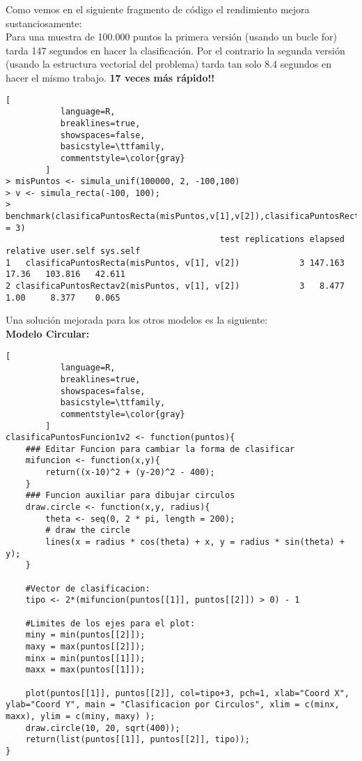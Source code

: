 \documentclass[11pt,fleqn]{book} %
\begin{document}
Como vemos en el siguiente fragmento de código el rendimiento mejora sustanciosamente:\\
Para una muestra de 100.000 puntos la primera versión (usando un bucle for) tarda 147 segundos en hacer la clasificación.
Por el contrario la segunda versión (usando la estructura vectorial del problema) tarda tan solo 8.4 segundos en hacer el mismo trabajo. \textbf{17 veces más rápido!!}

\begin{lstlisting}[
           language=R,
           breaklines=true,
           showspaces=false,
           basicstyle=\ttfamily,
           commentstyle=\color{gray}
        ]
> misPuntos <- simula_unif(100000, 2, -100,100)
> v <- simula_recta(-100, 100);
> benchmark(clasificaPuntosRecta(misPuntos,v[1],v[2]),clasificaPuntosRectav2(misPuntos,v[1],v[2]),replications = 3)
                                           test replications elapsed relative user.self sys.self
1   clasificaPuntosRecta(misPuntos, v[1], v[2])            3 147.163    17.36   103.816   42.611
2 clasificaPuntosRectav2(misPuntos, v[1], v[2])            3   8.477     1.00     8.377    0.065
\end{lstlisting}
Una solución mejorada para los otros modelos es la siguiente:\\
\textbf{Modelo Circular:}
\begin{lstlisting}[
           language=R,
           breaklines=true,
           showspaces=false,
           basicstyle=\ttfamily,
           commentstyle=\color{gray}
        ]
clasificaPuntosFuncion1v2 <- function(puntos){
    ### Editar Funcion para cambiar la forma de clasificar
    mifuncion <- function(x,y){
        return((x-10)^2 + (y-20)^2 - 400);
    }
    ### Funcion auxiliar para dibujar circulos 
    draw.circle <- function(x,y, radius){
        theta <- seq(0, 2 * pi, length = 200);
        # draw the circle
        lines(x = radius * cos(theta) + x, y = radius * sin(theta) + y);
    }
    
    #Vector de clasificacion:
    tipo <- 2*(mifuncion(puntos[[1]], puntos[[2]]) > 0) - 1
    
    #Limites de los ejes para el plot:
    miny = min(puntos[[2]]);
    maxy = max(puntos[[2]]);
    minx = min(puntos[[1]]);
    maxx = max(puntos[[1]]);
    
    plot(puntos[[1]], puntos[[2]], col=tipo+3, pch=1, xlab="Coord X", ylab="Coord Y", main = "Clasificacion por Circulos", xlim = c(minx, maxx), ylim = c(miny, maxy) );
    draw.circle(10, 20, sqrt(400));
    return(list(puntos[[1]], puntos[[2]], tipo));
}
\end{lstlisting}
\end{document}
